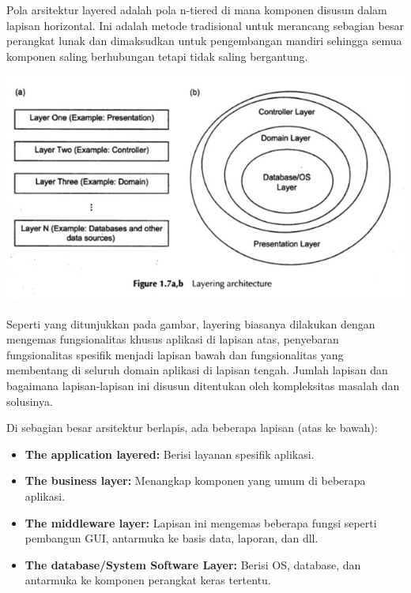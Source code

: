 \documentclass[a4paper,12pt]{article}
\begin{document}
Pola arsitektur layered adalah pola n-tiered di mana komponen disusun dalam lapisan horizontal. Ini adalah metode tradisional untuk merancang sebagian besar perangkat lunak dan dimaksudkan untuk pengembangan mandiri sehingga semua komponen saling berhubungan tetapi tidak saling bergantung.

\includegraphics{Img/Layering Architecture.jpg}

Seperti yang ditunjukkan pada gambar, layering biasanya dilakukan dengan mengemas fungsionalitas khusus aplikasi di lapisan atas, penyebaran fungsionalitas spesifik menjadi lapisan bawah dan fungsionalitas yang membentang di seluruh domain aplikasi di lapisan tengah. Jumlah lapisan dan bagaimana lapisan-lapisan ini disusun ditentukan oleh kompleksitas masalah dan solusinya.

Di sebagian besar arsitektur berlapis, ada beberapa lapisan (atas ke bawah):

\begin{itemize}
	\item \textbf{The application layered:} Berisi layanan spesifik aplikasi.
	\item \textbf{The business layer:} Menangkap komponen yang umum di beberapa aplikasi.
	\item \textbf{The middleware layer:} Lapisan ini mengemas beberapa fungsi seperti pembangun GUI, antarmuka ke basis data, laporan, dan dll.
	\item \textbf{The database/System Software Layer:} Berisi OS, database, dan antarmuka ke komponen perangkat keras tertentu.
\end{itemize}
\end{document}
